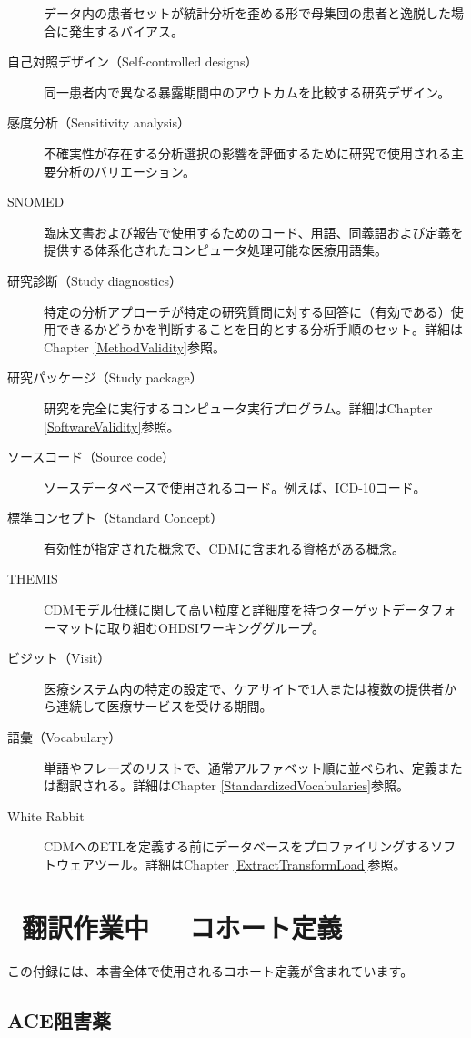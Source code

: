\documentclass[
  11pt]{book}
\theoremstyle{definition}
\theoremstyle{definition}
\theoremstyle{definition}
\theoremstyle{definition}
\theoremstyle{remark}
\begin{document}
\begin{description}
データ内の患者セットが統計分析を歪める形で母集団の患者と逸脱した場合に発生するバイアス。
\item[自己対照デザイン（Self-controlled designs）]
同一患者内で異なる暴露期間中のアウトカムを比較する研究デザイン。
\item[感度分析（Sensitivity analysis）]
不確実性が存在する分析選択の影響を評価するために研究で使用される主要分析のバリエーション。
\item[SNOMED]
臨床文書および報告で使用するためのコード、用語、同義語および定義を提供する体系化されたコンピュータ処理可能な医療用語集。
\item[研究診断（Study diagnostics）]
特定の分析アプローチが特定の研究質問に対する回答に（有効である）使用できるかどうかを判断することを目的とする分析手順のセット。詳細はChapter \ref{MethodValidity}参照。
\item[研究パッケージ（Study package）]
研究を完全に実行するコンピュータ実行プログラム。詳細はChapter \ref{SoftwareValidity}参照。
\item[ソースコード（Source code）]
ソースデータベースで使用されるコード。例えば、ICD-10コード。
\item[標準コンセプト（Standard Concept）]
有効性が指定された概念で、CDMに含まれる資格がある概念。
\item[THEMIS]
CDMモデル仕様に関して高い粒度と詳細度を持つターゲットデータフォーマットに取り組むOHDSIワーキンググループ。
\item[ビジット（Visit）]
医療システム内の特定の設定で、ケアサイトで1人または複数の提供者から連続して医療サービスを受ける期間。
\item[語彙（Vocabulary）]
単語やフレーズのリストで、通常アルファベット順に並べられ、定義または翻訳される。詳細はChapter \ref{StandardizedVocabularies}参照。
\item[White Rabbit]
CDMへのETLを定義する前にデータベースをプロファイリングするソフトウェアツール。詳細はChapter \ref{ExtractTransformLoad}参照。
\end{description}

\chapter{--翻訳作業中--　コホート定義}\label{CohortDefinitions}

この付録には、本書全体で使用されるコホート定義が含まれています。

\section{ACE阻害薬}\label{AceInhibitors}
\end{document}
